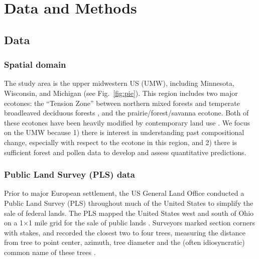 \documentclass[12pt]{article}
\begin{document}

\section{Data and Methods}

\subsection{Data}

\subsubsection{Spatial domain}

The study area is the upper midwestern US (UMW), including Minnesota,
Wisconsin, and Michigan (see Fig.~\ref{fig:pie}).  This region
includes two major ecotones: the ``Tension Zone'' between northern
mixed forests and temperate broadleaved deciduous forests
\citet{curtis1959vegetation}, and the prairie/forest/savanna ecotone.
Both of these ecotones have been heavily modified by contemporary land
use \citep{goring_witness}. We focus on the UMW because 1) there is
interest in understanding past compositional change, especially with
respect to the ecotone in this region, and 2) there is sufficient
forest and pollen data to develop and assess quantitative predictions.

\subsubsection{Public Land Survey (PLS) data}
Prior to major European settlement, the US General Land Office
conducted a Public Land Survey (PLS) throughout much of the United
States to simplify the sale of federal lands. The PLS mapped the
United States west and south of Ohio on a 1$\times$1 mile grid for the
sale of public lands \citep{stewart1935public,
  white1983history}. Surveyors marked section corners with stakes, and
recorded the closest two to four trees, measuring the distance from
tree to point center, azimuth, tree diameter and the (often
idiosyncratic) common name of these trees
\citep{mladenoff2002narrowing}.
\end{document}
